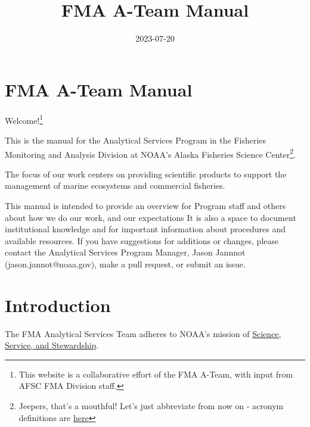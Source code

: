 \documentclass[
  letterpaper,
  DIV=11,
  numbers=noendperiod]{scrreprt}
\title{FMA A-Team Manual}
\author{}
\date{2023-07-20}
\renewcommand*\contentsname{Table of contents}
\newcommand\contentsname{Table of contents}
\begin{document}
\maketitle
\ifdefined\Shaded\renewenvironment{Shaded}{\begin{tcolorbox}[frame hidden, boxrule=0pt, sharp corners, borderline west={3pt}{0pt}{shadecolor}, interior hidden, breakable, enhanced]}{\end{tcolorbox}}\fi

\renewcommand*\contentsname{Table of contents}
{
\hypersetup{linkcolor=}
\setcounter{tocdepth}{2}
\tableofcontents
}

\hypertarget{fma-a-team-manual}{%
\chapter{FMA A-Team Manual}\label{fma-a-team-manual}}

Welcome!\footnote{This website is a collaborative effort of the FMA
  A-Team, with input from AFSC FMA Division staff.}

This is the manual for the Analytical Services Program in the Fisheries
Monitoring and Analysis Division at NOAA's Alaska Fisheries Science
Center\footnote{Jeepers, that's a mouthful! Let's just abbreviate from
  now on - acronym definitions are
  \protect\hyperlink{sec-acronyms}{here}}.

The focus of our work centers on providing scientific products to
support the management of marine ecosystems and commercial fisheries.

This manual is intended to provide an overview for Program staff and
others about how we do our work, and our expectations It is also a space
to document institutional knowledge and for important information about
procedures and available resources. If you have suggestions for
additions or changes, please contact the Analytical Services Program
Manager, Jason Jannnot (jason.jannot@noaa.gov), make a pull request, or
submit an issue.


\hypertarget{intro}{%
\chapter{Introduction}\label{intro}}

The FMA Analytical Services Team adheres to NOAA's mission of
\href{https://www.noaa.gov/our-mission-and-vision}{Science, Service, and
Stewardship}.
\end{document}
